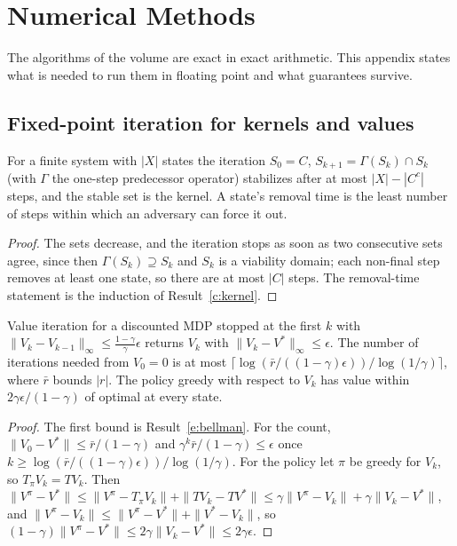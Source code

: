 \chapter{Numerical Methods}\label{app:numerics}

The algorithms of the volume are exact in exact arithmetic. This appendix states what is needed to run them in floating point and what guarantees survive.

\section{Fixed-point iteration for kernels and values}

\begin{newresult}\label{g:kernel-iter}
For a finite system with $|X|$ states the iteration $S_0=C$, $S_{k+1}=\Gamma(S_k)\cap S_k$ (with $\Gamma$ the one-step predecessor operator) stabilizes after at most $|X|-|C^c|$ steps, and the stable set is the kernel. A state's removal time is the least number of steps within which an adversary can force it out.
\end{newresult}
\begin{proof}
The sets decrease, and the iteration stops as soon as two consecutive sets agree, since then $\Gamma(S_k)\supseteq S_k$ and $S_k$ is a viability domain; each non-final step removes at least one state, so there are at most $|C|$ steps. The removal-time statement is the induction of Result~\ref{c:kernel}.
\end{proof}

\begin{newresult}\label{g:vi}
Value iteration for a discounted MDP stopped at the first $k$ with $\|V_k-V_{k-1}\|_\infty\le\tfrac{1-\gamma}{\gamma}\epsilon$ returns $V_k$ with $\|V_k-V^*\|_\infty\le\epsilon$. The number of iterations needed from $V_0=0$ is at most $\lceil\log(\bar r/((1-\gamma)\epsilon))/\log(1/\gamma)\rceil$, where $\bar r$ bounds $|r|$. The policy greedy with respect to $V_k$ has value within $2\gamma\epsilon/(1-\gamma)$ of optimal at every state.
\end{newresult}
\begin{proof}
The first bound is Result~\ref{e:bellman}. For the count, $\|V_0-V^*\|\le\bar r/(1-\gamma)$ and $\gamma^k\bar r/(1-\gamma)\le\epsilon$ once $k\ge\log(\bar r/((1-\gamma)\epsilon))/\log(1/\gamma)$. For the policy let $\pi$ be greedy for $V_k$, so $T_\pi V_k=TV_k$. Then $\|V^\pi-V^*\|\le\|V^\pi-T_\pi V_k\|+\|TV_k-TV^*\|\le\gamma\|V^\pi-V_k\|+\gamma\|V_k-V^*\|$, and $\|V^\pi-V_k\|\le\|V^\pi-V^*\|+\|V^*-V_k\|$, so $(1-\gamma)\|V^\pi-V^*\|\le2\gamma\|V_k-V^*\|\le2\gamma\epsilon$.
\end{proof}


